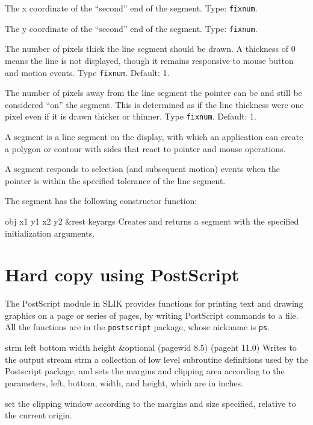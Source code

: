 \documentclass[twoside,openright,11pt]{report}
\newcommand{\tp}[1]{\texttt{#1}}
\begin{document}
{The x coordinate of the ``second'' end of the segment.  Type:
\tp{fixnum}.}

{The y coordinate of the ``second'' end of the segment.  Type:
\tp{fixnum}.}

{The number of pixels thick the line segment should be drawn.  A
thickness of 0 means the line is not displayed, though it remains
responsive to mouse button and motion events.  Type \tp{fixnum}.
Default: 1.}

{The number of pixels away from the line segment the pointer can be
and still be considered ``on'' the segment.  This is determined as if
the line thickness were one pixel even if it is drawn thicker or
thinner.  Type \tp{fixnum}.  Default: 1.}

A segment is a line segment on the display, with which an application
can create a polygon or contour with sides that react to pointer and
mouse operations.

A segment responds to selection (and subsequent motion) events when
the pointer is within the specified tolerance of the line segment.

The segment has the following constructor function:

{obj x1 y1 x2 y2 \&rest keyargs}
{Creates and returns a segment with the specified initialization
arguments.}

\chapter{Hard copy using PostScript}

The PostScript module in SLIK provides functions for printing text and
drawing graphics on a page or series of pages, by writing PostScript
commands to a file.  All the functions are in the \tp{postscript}
package, whose nickname is \tp{ps}.


{strm left bottom width height \&optional (pagewid 8.5) (pageht 11.0)}
{Writes to the output stream strm a collection of low level subroutine
definitions used by the Postscript package, and sets the margins and
clipping area according to the parameters, left, bottom, width, and
height, which are in inches.}

{set the clipping window according to the margins and size specified,
relative to the current origin.}
\end{document}
